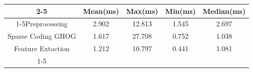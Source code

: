 \documentclass{standalone}
\begin{document}
 
 \begin{tabular}{|c |c |c |c |c |}
\cline{2-5}\cline{2-5} \multicolumn{1}{c |}{ } & Mean(ms) & Max(ms) & Min(ms) & Median(ms)\\ 
\cline{1-5}Preprocessing & 2.902 & 12.813 & 1.545 & 2.697\\ 
 \hhline{|=|=|=|=|=|}Sparse Coding GHOG & 1.617 & 27.708 & 0.752 & 1.038\\ 
 \hhline{|=|=|=|=|=|}Feature Extaction & 1.212 & 10.797 & 0.441 & 1.081\\ 
 \cline{1-5}\hline \end{tabular}
 
\end{document}
